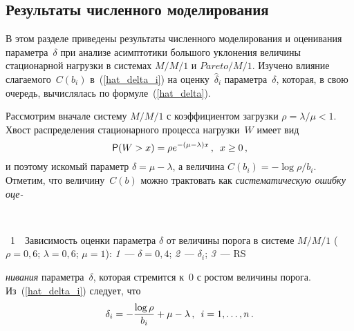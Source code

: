 \begin{multicols}{2}
\section{Результаты численного моделирования}

В этом  разделе приведены  результаты численного моделирования и
оценивания  параметра~$\delta$ при анализе асимптотики большого
уклонения величины стационарной нагрузки  в системах $M/M/1$ и
$Pareto/M/1$. Изучено влияние слагаемого~$C(b_i)$ в~(\ref{hat_delta_i}) на оценку~$\hat\delta_i$  параметра~$\delta$,
которая, в свою очередь, вычислялась по формуле~(\ref{hat_delta}).

Рассмотрим вначале систему $M/M/1$ с коэффициентом загрузки $\rho =
\lambda / \mu < 1$.
Хвост распределения стационарного процесса нагрузки~$W$ имеет вид
\begin{equation}
{\sf P} (W > x) = \rho e^{-(\mu - \lambda )x}\,, \enskip x \ge 0\,, 
\label{prob_W}
\end{equation}
и поэтому искомый параметр  $\delta = \mu - \lambda $, а величина
$C(b_i) = -\log \rho/b_i$.  Отметим, что величину~$C(b)$ можно
трактовать как {\it систематическую ошибку оце-}
\begin{center} %
\vspace*{3pt}
\mbox{%
\epsfxsize=72.615mm
}
\end{center}
\vspace*{4pt}
{{\figurename~1}\ \ \small{Зависимость  оценки параметра $\delta$ от величины порога в
системе $M/M/1$
($\rho=0{,}6$; $\lambda=0{,}6$; $\mu=1$): \textit{1}~--- $\delta=0{,}4$; \textit{2}~--- $\delta_i$;
\textit{3}~--- RS}}
\vspace*{9pt}

\bigskip
\addtocounter{figure}{1}

\noindent
\textit{нивания} параметра~$\delta$, 
которая стремится к~0 с ростом величины порога. Из~(\ref{hat_delta_i}) следует, что
$$
\delta_i =-\displaystyle\frac{\displaystyle \log \rho\mathstrut}{\displaystyle b_i\mathstrut} + \mu - \lambda\,,\enskip i=1, \ldots,n\,.
$$




\end{multicols}
